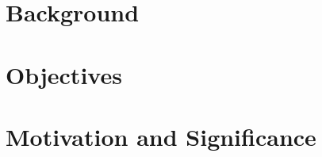 \section{Background}
\lipsum[4-10]
\section{Objectives}
\lipsum[6-10]
\section{Motivation and Significance}
\lipsum[8-10]